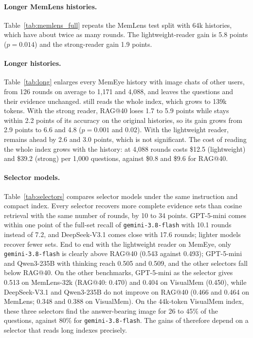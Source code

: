 \paragraph{Longer MemLens histories.} Table~\ref{tab:memlens_full} repeats the MemLens test split with 64k histories, which have about twice as many rounds. The lightweight-reader gain is 5.8 points ($p{=}0.014$) and the strong-reader gain 1.9 points.



\paragraph{Longer histories.} Table~\ref{tab:long} enlarges every MemEye history with image chats of other users, from 126 rounds on average to 1,171 and 4,088, and leaves the questions and their evidence unchanged. \vgs{} still reads the whole index, which grows to 139k tokens. With the strong reader, RAG@40 loses 1.7 to 5.9 points while \vgs{} stays within 2.2 points of its accuracy on the original histories, so its gain grows from 2.9 points to 6.6 and 4.8 ($p{=}0.001$ and $0.02$). With the lightweight reader, \vgs{} remains ahead by 2.6 and 3.0 points, which is not significant. The cost of reading the whole index grows with the history: at 4,088 rounds \vgs{} costs \$12.5 (lightweight) and \$39.2 (strong) per 1,000 questions, against \$0.8 and \$9.6 for RAG@40.



\paragraph{Selector models.} Table~\ref{tab:selectors} compares selector models under the same instruction and compact index. Every selector recovers more complete evidence sets than cosine retrieval with the same number of rounds, by 10 to 34 points. GPT-5-mini comes within one point of the full-set recall of \texttt{gemini-3.8-flash} with 10.1 rounds instead of 7.2, and DeepSeek-V3.1 comes close with 17.6 rounds; lighter models recover fewer sets. End to end with the lightweight reader on MemEye, only \texttt{gemini-3.8-flash} is clearly above RAG@40 (0.543 against 0.493); GPT-5-mini and Qwen3-235B with thinking reach 0.505 and 0.509, and the other selectors fall below RAG@40. On the other benchmarks, GPT-5-mini as the selector gives 0.513 on MemLens-32k (RAG@40: 0.470) and 0.404 on VisualMem (0.450), while DeepSeek-V3.1 and Qwen3-235B do not improve on RAG@40 (0.466 and 0.464 on MemLens; 0.348 and 0.388 on VisualMem). On the 44k-token VisualMem index, these three selectors find the answer-bearing image for 26 to 45\% of the questions, against 80\% for \texttt{gemini-3.8-flash}. The gains of \vgs{} therefore depend on a selector that reads long indexes precisely.

